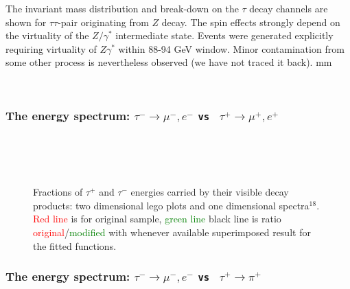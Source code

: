 The invariant mass distribution and break-down on the $\tau$ decay channels are shown
for $\tau \tau$-pair originating from $Z$ decay.
The spin effects strongly depend on the virtuality of the
$Z/\gamma^*$ intermediate state. Events were generated explicitly requiring virtuality
of $Z\gamma^*$ within 88-94 GeV window. Minor 
contamination from some other process is nevertheless observed (we have not traced it back).
 mm

\begin{figure}[h!]
\centering 
{} \\
\end{figure}

{\small {} }

\newpage
\subsubsection{The energy spectrum: $\tau^- \to \mu^-, e^-$ {\tt vs } $\tau^+ \to \mu^+, e^+$}
\vspace{3\baselineskip}

\begin{figure}[h!]
\centering
{}
 \\
 \\
 \\
\caption{ \small Fractions of  $\tau^+$ and $\tau^-$ energies carried by their visible  decay products:
two dimensional lego plots and one dimensional spectra$^{18}$.
\textcolor{red}{Red line} is  for original sample,
\textcolor{green}{green line} \greenlineis
black line is ratio \textcolor{red}{original}/\textcolor{green}{modified} with whenever available superimposed result for the
fitted functions.
}\label{Fig:spectra1}
\end{figure}

\newpage
\subsubsection{The energy spectrum: $\tau^- \to \mu^-, e^-$ {\tt vs } $\tau^+ \to \pi^+$}
\vspace{3\baselineskip}

